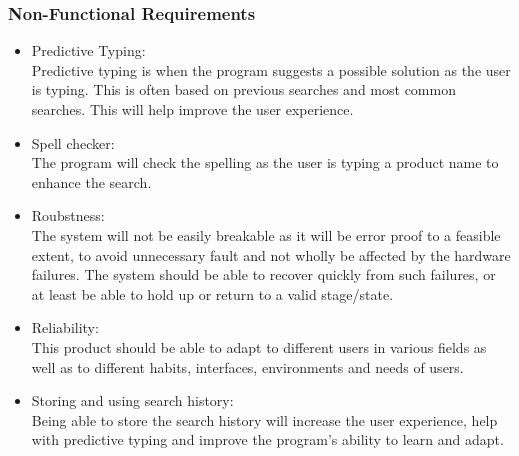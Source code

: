 \documentclass[a4paper,10pt]{article}
\begin{document}
	\subsubsection{Non-Functional Requirements}
		\begin{itemize}
		\item Predictive Typing:\\
			Predictive typing is when the program suggests a possible solution as the user is typing. This is often based on previous searches and most common searches. This will help improve the user experience. 
		
		\item Spell checker:\\
			The program will check the spelling as the user is typing a product name to enhance the search. 

		\item Roubstness:\\
			The system will not be easily breakable as it will be error proof to a feasible extent, to avoid unnecessary fault and not wholly be affected by the hardware failures. The system should be able to recover quickly from such failures, or at least be able to hold up or return to a valid stage/state.
			
			
		\item Reliability:\\
			This product should be able to adapt to different users in various fields as well as to different habits, interfaces, environments and needs of users.  
	
		\item Storing and using search history:\\
			Being able to store the search history will increase the user experience, help with predictive typing and improve the program's ability to learn and adapt.\\
		\end{itemize}

	
\end{document}
